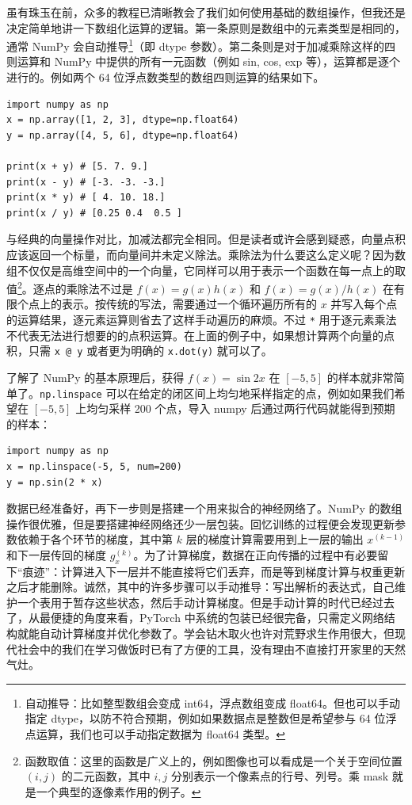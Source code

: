 虽有珠玉在前，众多的教程已清晰教会了我们如何使用基础的数组操作，但我还是决定简单地讲一下数组化运算的逻辑。第一条原则是数组中的元素类型是相同的，通常 NumPy 会自动推导\footnote{自动推导：比如整型数组会变成 int64，浮点数组变成 float64。但也可以手动指定 dtype，以防不符合预期，例如如果数据点是整数但是希望参与 64 位浮点运算，我们也可以手动指定数据为 float64 类型。}（即 dtype 参数）。第二条则是对于加减乘除这样的四则运算和 NumPy 中提供的所有一元函数（例如 sin, cos, exp 等），运算都是逐个进行的。例如两个 64 位浮点数类型的数组四则运算的结果如下。
\begin{verbatim}
import numpy as np
x = np.array([1, 2, 3], dtype=np.float64)
y = np.array([4, 5, 6], dtype=np.float64)

print(x + y) # [5. 7. 9.]
print(x - y) # [-3. -3. -3.]
print(x * y) # [ 4. 10. 18.]
print(x / y) # [0.25 0.4  0.5 ]
\end{verbatim}

与经典的向量操作对比，加减法都完全相同。但是读者或许会感到疑惑，向量点积应该返回一个标量，而向量间并未定义除法。乘除法为什么要这么定义呢？因为数组不仅仅是高维空间中的一个向量，它同样可以用于表示一个函数在每一点上的取值\footnote{函数取值：这里的函数是广义上的，例如图像也可以看成是一个关于空间位置 $(i, j)$ 的二元函数，其中 $i,j$ 分别表示一个像素点的行号、列号。乘 mask 就是一个典型的逐像素作用的例子。}。逐点的乘除法不过是 $f(x) = g(x) h(x)$ 和 $f(x) = g(x) / h(x)$ 在有限个点上的表示。按传统的写法，需要通过一个循环遍历所有的 $x$ 并写入每个点的运算结果，逐元素运算则省去了这样手动遍历的麻烦。不过 \texttt{*} 用于逐元素乘法不代表无法进行想要的的点积运算。在上面的例子中，如果想计算两个向量的点积，只需 \texttt{x @ y} 或者更为明确的 \texttt{x.dot(y)} 就可以了。

了解了 NumPy 的基本原理后，获得 $f(x) = \sin 2x$ 在 $[-5, 5]$ 的样本就非常简单了。\texttt{np.linspace} 可以在给定的闭区间上均匀地采样指定的点，例如如果我们希望在 $[-5, 5]$ 上均匀采样 200 个点，导入 numpy 后通过两行代码就能得到预期的样本：
\begin{verbatim}
import numpy as np
x = np.linspace(-5, 5, num=200)
y = np.sin(2 * x)
\end{verbatim}

数据已经准备好，再下一步则是搭建一个用来拟合的神经网络了。NumPy 的数组操作很优雅，但是要搭建神经网络还少一层包装。回忆训练的过程便会发现更新参数依赖于各个环节的梯度，其中第 $k$ 层的梯度计算需要用到上一层的输出 $x^{(k - 1)}$ 和下一层传回的梯度 $g_x^{(k)}$。为了计算梯度，数据在正向传播的过程中有必要留下“痕迹”：计算进入下一层并不能直接将它们丢弃，而是等到梯度计算与权重更新之后才能删除。诚然，其中的许多步骤可以手动推导：写出解析的表达式，自己维护一个表用于暂存这些状态，然后手动计算梯度。但是手动计算的时代已经过去了，从最便捷的角度来看，PyTorch 中系统的包装已经很完备，只需定义网络结构就能自动计算梯度并优化参数了。学会钻木取火也许对荒野求生作用很大，但现代社会中的我们在学习做饭时已有了方便的工具，没有理由不直接打开家里的天然气灶。

